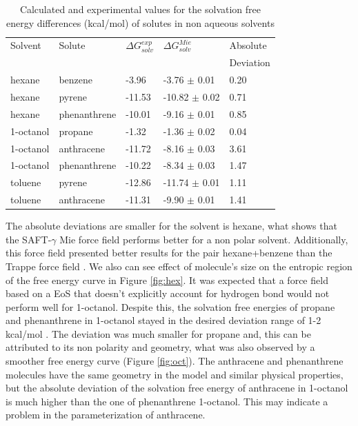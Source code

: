 \begin{table}[h]
\centering
  \caption{Calculated and experimental values for the solvation free energy differences (kcal/mol) of solutes in non aqueous solvents}
  \label{tbl:solv1}
  \begin{tabular}{lllll}
    \hline
      Solvent & Solute & $\Delta G_{solv}^{exp}$ & $\Delta G_{solv}^{Mie}$ & Absolute \\
      & & & & Deviation \\
    \hline
    hexane    & benzene      & -3.96  & -3.76  $\pm$ 0.01 & 0.20 \\
    hexane    & pyrene       & -11.53 & -10.82 $\pm$ 0.02 & 0.71 \\
    hexane    & phenanthrene & -10.01 & -9.16  $\pm$ 0.01 & 0.85 \\
    1-octanol & propane      & -1.32  & -1.36  $\pm$ 0.02 & 0.04 \\
    1-octanol & anthracene   & -11.72 & -8.16  $\pm$ 0.03 & 3.61 \\
    1-octanol & phenanthrene & -10.22 & -8.34  $\pm$ 0.03 & 1.47 \\
    toluene   & pyrene       & -12.86 & -11.74 $\pm$ 0.01 & 1.11\\
    toluene   & anthracene   & -11.31 & -9.90 $\pm$ 0.01 & 1.41\\
    \hline
  \end{tabular}
\end{table}

The absolute deviations are smaller for the solvent is hexane, what shows that the SAFT-$\gamma$ Mie force field performs better for a non polar solvent. Additionally, this force field presented better results for the pair hexane+benzene than the Trappe force field \cite{garrido2011}. We also can see effect of molecule's size on the entropic region of the free energy curve in Figure \ref{fig:hex}. It was expected that a force field based on a EoS that doesn't explicitly account for hydrogen bond would not perform well for 1-octanol. Despite this, the solvation free energies of propane and phenanthrene in 1-octanol stayed in the desired deviation range of 1-2 kcal/mol \cite{doimobley}. The deviation was much smaller for propane and, this can be attributed to its non polarity and geometry, what was also observed by a smoother free energy curve (Figure \ref{fig:oct}). The anthracene and phenanthrene molecules have the same geometry in the model and similar physical properties, but the absolute deviation of the solvation free energy of anthracene in 1-octanol is much higher than the one of phenanthrene 1-octanol. This may indicate a problem in the parameterization of anthracene.     

